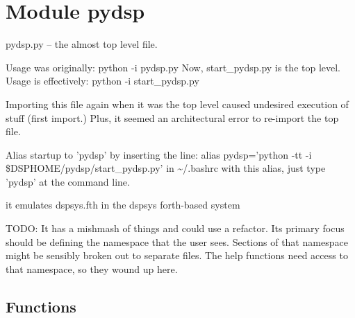 %
%
%


\section{Module pydsp}

    \label{pydsp}
pydsp.py -- the almost top level file.

Usage was originally: python -i pydsp.py Now, start\_pydsp.py is the top 
level. Usage is effectively: python -i start\_pydsp.py

Importing this file again when it was the top level caused undesired 
execution of stuff (first import.) Plus, it seemed an architectural error 
to re-import the top file.

Alias startup to 'pydsp' by inserting the line: alias pydsp='python -tt -i 
\$DSPHOME/pydsp/start\_pydsp.py' in {\textasciitilde}/.bashrc with this 
alias, just type 'pydsp' at the command line.

it emulates dspsys.fth in the dspsys forth-based system

TODO: It has a mishmash of things and could use a refactor. Its primary 
focus should be defining the namespace that the user sees. Sections of that
namespace might be sensibly broken out to separate files. The help 
functions need access to that namespace, so they wound up here.



  \subsection{Functions}

    \label{pydsp:help}

    \vspace{0.5ex}


